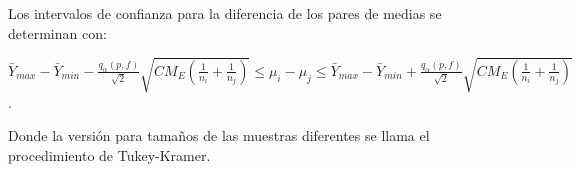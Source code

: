 Los intervalos de confianza para la diferencia de los pares de medias se determinan con:\\


\begin{center}
	$ \bar{Y}_{max} -\bar{Y}_{min} -  \frac{q_{\alpha} (p,f)}{\sqrt{2}} \sqrt{CM_{E} (\frac{1}{n_{i}} + \frac{1}{n_{j}})}  \leq \mu_{i} - \mu_{j} \leq \bar{Y}_{max} -\bar{Y}_{min} + \frac{q_{\alpha} (p,f)}{\sqrt{2}} \sqrt{CM_{E} (\frac{1}{n_{i}} + \frac{1}{n_{j}})}  $. \\
\end{center}

Donde la versión para tamaños de las muestras diferentes se llama el procedimiento de Tukey-Kramer.
